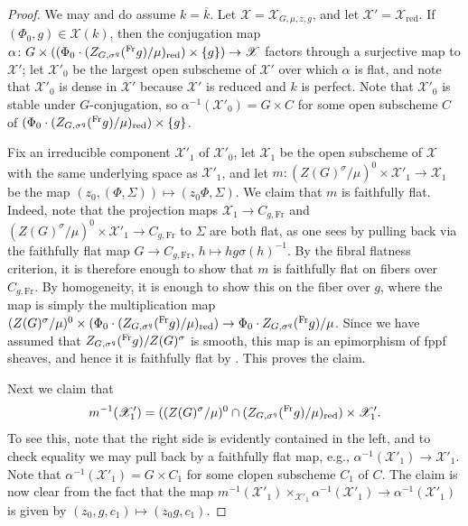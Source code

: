 \documentclass[11pt,reqno]{amsart}
\theoremstyle{definition}
\renewcommand{\rm}{\mathrm}
\newcommand{\sX}{{\mathscr X}}
\newcommand{\ov}[1]{\overline{#1}}
\begin{document}
\begin{proof}
    We may and do assume $k = \ov{k}$. Let $\sX = \sX_{G,\mu,z,g}$, and let $\sX' = \sX_{\rm{red}}$.
    If $(\Phi_0, g) \in \sX(k)$, then the conjugation map $\alpha\colon G \times ((\Phi_0 \cdot (Z_{G,\sigma^q}(\prescript{\rm{Fr}}{}{g})/\mu)_{\rm{red}}) \times \{g\}) \to \sX$ factors through a surjective map to $\sX'$; let $\sX'_0$ be the largest open subscheme of $\sX'$ over which $\alpha$ is flat, and note that $\sX'_0$ is dense in $\sX'$ because $\sX'$ is reduced and $k$ is perfect. Note that $\sX'_0$ is stable under $G$-conjugation, so $\alpha^{-1}(\sX'_0) = G \times C$ for some open subscheme $C$ of $(\Phi_0 \cdot (Z_{G,\sigma^q}(\prescript{\rm{Fr}}{}{g})/\mu)_{\rm{red}}) \times \{g\}$.
    
    Fix an irreducible component $\sX'_1$ of $\sX'_0$, let $\sX_1$ be the open subscheme of $\sX$ with the same underlying space as $\sX'_1$, and let $m\colon (Z(G)^\sigma/\mu)^0 \times \sX'_1 \to \sX_1$ be the map $(z_0, (\Phi, \Sigma)) \mapsto (z_0\Phi, \Sigma)$. We claim that $m$ is faithfully flat. Indeed, note that the projection maps $\sX_1 \to C_{g,\rm{Fr}}$ and $(Z(G)^\sigma/\mu)^0 \times \sX'_1 \to C_{g,\rm{Fr}}$ to $\Sigma$ are both flat, as one sees by pulling back via the faithfully flat map $G \to C_{g,\rm{Fr}}$, $h \mapsto hg\sigma(h)^{-1}$. By the fibral flatness criterion, it is therefore enough to show that $m$ is faithfully flat on fibers over $C_{g,\rm{Fr}}$. By homogeneity, it is enough to show this on the fiber over $g$, where the map is simply the multiplication map $(Z(G)^\sigma/\mu)^0 \times (\Phi_0 \cdot (Z_{G,\sigma^q}(\prescript{\rm{Fr}}{}{g})/\mu)_{\rm{red}}) \to \Phi_0 \cdot Z_{G,\sigma^q}(\prescript{\rm{Fr}}{}{g})/\mu$. Since we have assumed that $Z_{G,\sigma^q}(\prescript{\rm{Fr}}{}{g})/Z(G)^\sigma$ is smooth, this map is an epimorphism of fppf sheaves, and hence it is faithfully flat by \cite[Expos\'e VI\textsubscript{B}, Remarque 9.2.2]{SGA3I}. This proves the claim.
    
    Next we claim that 
    \[
    m^{-1}(\sX'_1) = ((Z(G)^\sigma/\mu)^0 \cap (Z_{G,\sigma^q}(\prescript{\rm{Fr}}{}{g})/\mu)_{\rm{red}}) \times \sX'_1.
    \]
    To see this, note that the right side is evidently contained in the left, and to check equality we may pull back by a faithfully flat map, e.g., $\alpha^{-1}(\sX'_1) \to \sX'_1$. Note that $\alpha^{-1}(\sX'_1) = G \times C_1$ for some clopen subscheme $C_1$ of $C$. The claim is now clear from the fact that the map $m^{-1}(\sX'_1) \times_{\sX'_1} \alpha^{-1}(\sX'_1) \to \alpha^{-1}(\sX'_1)$ is given by $(z_0, g, c_1) \mapsto (z_0g, c_1)$.
    

\end{proof}
\end{document}
